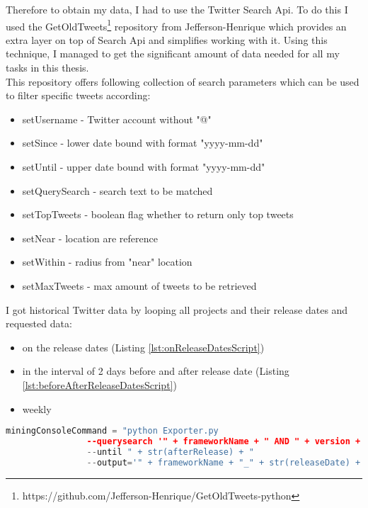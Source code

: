Therefore to obtain my data, I had to use the Twitter Search Api. To do this I used the GetOldTweets\footnote{https://github.com/Jefferson-Henrique/GetOldTweets-python} repository from Jefferson-Henrique which provides an extra layer on top of Search Api and simplifies working with it. Using this technique, I managed to get the significant amount of data needed for all my tasks in this thesis.\\
This repository offers following collection of search parameters which can be used to filter specific tweets according:
\begin{itemize}
  \item setUsername - Twitter account without "@"
  \item setSince - lower date bound with format "yyyy-mm-dd"
  \item setUntil - upper date bound with format "yyyy-mm-dd"
  \item setQuerySearch - search text to be matched
  \item setTopTweets - boolean flag whether to return only top tweets
  \item setNear - location are reference 
  \item setWithin - radius from "near" location
  \item setMaxTweets - max amount of tweets to be retrieved
\end{itemize}


I got historical Twitter data by looping all projects and their release dates and requested data: 

\begin{itemize}
  \item on the release dates (Listing \ref{lst:onReleaseDatesScript})
  \item in the interval of 2 days before and after  release date (Listing \ref{lst:beforeAfterReleaseDatesScript})
  \item weekly
\end{itemize}


\begin{lstlisting}[caption={Creating command to get Tweets about a project version on release dates},label={lst:onReleaseDatesScript},language=Python]
miningConsoleCommand = "python Exporter.py 
				--querysearch '" + frameworkName + " AND " + version + "'    --since " + str(releaseDate) + " 
				--until " + str(afterRelease) + " 
				--output='" + frameworkName + "_" + str(releaseDate) + ".csv" + "'"
\end{lstlisting}


